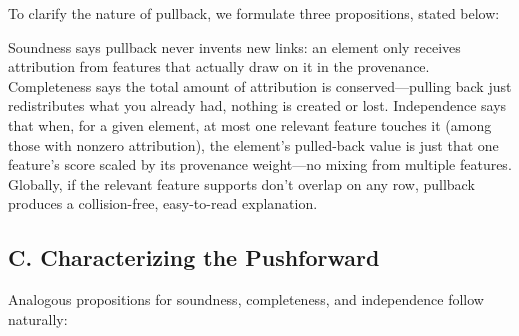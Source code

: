 To clarify the nature of pullback, we formulate three propositions, stated below:




Soundness says pullback never invents new links: an element only receives attribution from features that actually draw on it in the provenance. Completeness says the total amount of attribution is conserved—pulling back just redistributes what you already had, nothing is created or lost. Independence says that when, for a given element, at most one relevant feature touches it (among those with nonzero attribution), the element’s pulled-back value is just that one feature’s score scaled by its provenance weight—no mixing from multiple features. Globally, if the relevant feature supports don’t overlap on any row, pullback produces a collision-free, easy-to-read explanation.

\subsection*{C. Characterizing the Pushforward}

Analogous propositions for soundness, completeness, and independence follow naturally:



